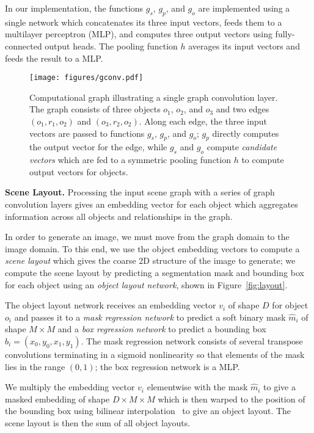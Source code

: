\documentclass[10pt,twocolumn,letterpaper]{article}
\begin{document}
In our implementation, the functions $g_s$, $g_p$, and $g_o$ are implemented using
a single network which concatenates its three input vectors, feeds them to a multilayer
perceptron (MLP), and computes three output vectors using fully-connected output heads.
The pooling function $h$ averages its input vectors and feeds the result to a MLP.

\begin{figure}[t]
  \centering
  \texttt{[image: figures/gconv.pdf]}
  \caption{
    Computational graph illustrating a single graph convolution layer.
    The graph consists of three objects $o_1$, $o_2$, and $o_3$ and two
    edges $(o_1, r_1, o_2)$ and $(o_3, r_2, o_2)$. Along each edge, the three
    input vectors are passed to functions $g_s$, $g_p$, and $g_o$; $g_p$ directly
    computes the output vector for the edge, while $g_s$ and $g_o$ compute
    \emph{candidate vectors} which are fed to a symmetric pooling function $h$
    to compute output vectors for objects.
  }
  \vspace{-2mm}
  \label{fig:gconv}
\end{figure}

\textbf{Scene Layout.}
Processing the input scene graph with a series of graph convolution layers
gives an embedding vector for each object which aggregates information across
all objects and relationships in the graph.

In order to generate an image, we must move from the graph domain to the image
domain. To this end, we use the object embedding vectors to compute a
\emph{scene layout} which gives the coarse 2D structure of the image to
generate; we compute the scene layout by predicting a segmentation mask and
bounding box for each object using an \emph{object layout network}, shown in
Figure~\ref{fig:layout}.


The object layout network receives an embedding vector $v_i$ of shape $D$ for
object $o_i$ and passes
it to a \emph{mask regression network} to predict a soft binary mask $\hat m_i$ 
of shape $M\times M$ and a \emph{box regression network} to predict a bounding box
$\hat b_i=(x_0, y_0, x_1, y_1)$. The mask regression network consists of several
transpose convolutions terminating in a sigmoid nonlinearity so that
elements of the mask lies in the range $(0, 1)$; the box regression network
is a MLP. 

We multiply the embedding vector $v_i$ elementwise with the mask $\hat m_i$
to give a masked embedding of shape $D\times M\times M$ which is then warped
to the position of the bounding box using bilinear
interpolation~\cite{jaderberg2015spatial} to give an object layout.
The scene layout is then the sum of all object layouts.
\end{document}
